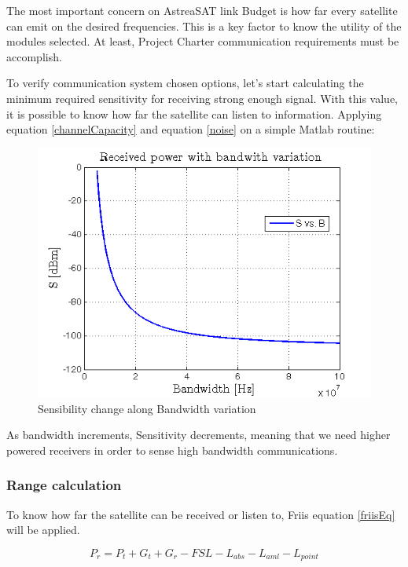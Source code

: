 The most important concern on AstreaSAT link Budget is how far every satellite can emit on the desired frequencies. This is a key factor to know the utility of the modules selected. At least, Project Charter communication requirements must be accomplish.
 
To verify communication system chosen options, let's start calculating the minimum required sensitivity for receiving strong enough signal. With this value, it is possible to know how far the satellite can listen to information.
Applying equation \ref{channelCapacity} and equation \ref{noise} on a simple Matlab routine:

\begin{figure}[H]
\includegraphics[scale=0.9]{./sections/SatelliteDept/sections/images/SvsB}
\centering
\caption{Sensibility change along Bandwidth variation}
\label{SvsB}
\end{figure}

As bandwidth increments, Sensitivity decrements, meaning that we need higher powered receivers in order to sense high bandwidth communications.

\subsubsection{Range calculation}
To know how far the satellite can be received or listen to, Friis equation \ref{friisEq} will be applied.
 
\begin{equation}
	P_r=P_t+G_t+G_r -FSL -L_{abs}-L_{aml}-L_{point}
	\label{friisEq}
\end{equation}

